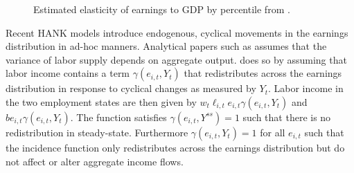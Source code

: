 




\begin{figure}[H]
\caption{Estimated elasticity of earnings to GDP by percentile from \citet{guvenen2017worker}.}
\label{fig:Song_et_al}
\end{figure}


Recent HANK models introduce endogenous, cyclical movements in the earnings distribution in ad-hoc manners. Analytical papers such as \citet{acharya2020understanding} assumes that the variance of labor supply depends on aggregate output. \citet{auclert2018inequality} does so by assuming that labor income contains a term $\gamma\left(e_{i,t},Y_{t}\right)$ that redistributes across the earnings distribution in response to cyclical changes as measured by $Y_t$.
Labor income in the two employment states are then given by $w_{t}\ell_{i,t}e_{i,t} \gamma\left(e_{i,t},Y_{t}\right)$ and $be_{i,t}\gamma\left(e_{i,t},Y_{t}\right)$. The function satisfies $\gamma\left(e_{i,t},Y^{ss}\right)=1$ such that there is no redistribution in steady-state. Furthermore $\gamma\left(e_{i,t},Y_{t}\right)=1$ for all $e_{i,t}$ such that the incidence function only redistributes across the earnings distribution but do not affect or alter aggregate income flows. 


